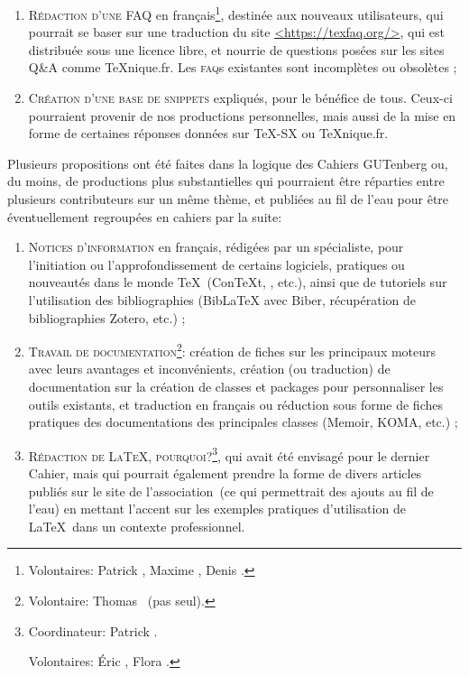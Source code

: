\documentclass{tufte-handout}
\newcommand{\ratio}[3][]{\marginpar{\footnotesize{\textcolor{teal}{Temps requis: #2 / Utilité: #3}\par\noindent \textcolor{teal}{#1}}}}
\begin{document}
\begin{enumerate}
\item\textsc{Rédaction d'une FAQ}\ratio[Effort collectif possible]{+++}{+++} en
  français\footnote{Volontaires: Patrick , Maxime ,
    Denis .}, destinée aux nouveaux utilisateurs, qui pourrait se
  baser sur une traduction du site \url{<https://texfaq.org/>}, qui est
  distribuée sous une licence libre, et nourrie de questions posées sur les
  sites Q\&A comme \TeX nique.fr. Les \textsc{faq}s existantes sont incomplètes
  ou obsolètes ;
\item\textsc{Création d'une base de snippets}\ratio[Petites contributions
  régulières, sur le long terme]{++}{+++} expliqués, pour le bénéfice de
  tous. Ceux-ci pourraient provenir de nos productions personnelles, mais aussi
  de la mise en forme de certaines réponses données sur TeX-SX ou \TeX nique.fr.
\end{enumerate}

Plusieurs propositions\ratio[Contributions substantielles, mais réparties entre
les auteurs]{+++}{+++} ont été faites dans la logique des Cahiers GUTenberg ou,
du moins, de productions plus substantielles qui pourraient être réparties entre
plusieurs contributeurs sur un même thème, et publiées au fil de l'eau pour être
éventuellement regroupées en cahiers par la suite:

\begin{enumerate}
\item\textsc{Notices d'information}\ratio[Individuellement assez peu
  chronophage, d'autant que certaines ressources existent]{++}{+++} en français,
  rédigées par un spécialiste, pour l'initiation ou l'approfondissement de
  certains logiciels, pratiques ou nouveautés dans le monde \TeX\ (Con\TeX t,
  \LuaTeX, etc.), ainsi que de tutoriels sur l'utilisation des bibliographies
  (Bib\LaTeX{} avec Biber, récupération de bibliographies Zotero, etc.) ;
\item\textsc{Travail de documentation}\ratio[Plus ou moins chronophage selon les
  projets]{++}{+++}\footnote{Volontaire: Thomas ~(pas seul).}:
  création de fiches sur les principaux moteurs avec leurs avantages et
  inconvénients, création (ou traduction) de documentation sur la création de
  classes et packages pour personnaliser les outils existants, et traduction en
  français ou réduction sous forme de fiches pratiques des documentations des
  principales classes (Memoir, KOMA, etc.) ;
\item\textsc{Rédaction de \LaTeX, pourquoi?}\ratio[Plusieurs contributions sont
  dans les tuyaux]{++}{+++}\footnote{Coordinateur: Patrick
    .\par\noindent Volontaires: Éric , Flora
    .}, qui avait été envisagé pour le dernier Cahier, mais qui
  pourrait également prendre la forme de divers articles publiés sur le site de
  l'association~(ce qui permettrait des ajouts au fil de l'eau) en mettant
  l'accent sur les exemples pratiques d'utilisation de \LaTeX\ dans un contexte
  professionnel.
\end{enumerate}
\end{document}
